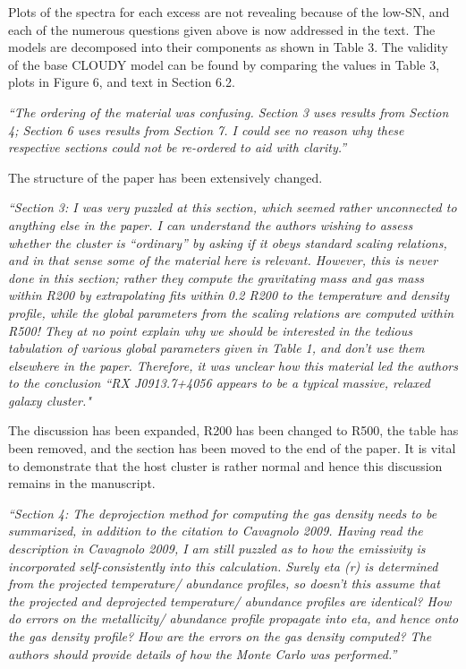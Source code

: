\documentclass[11pt]{article}
\begin{document}
Plots of the spectra for each excess are not revealing because of the
low-SN, and each of the numerous questions given above is now
addressed in the text. The models are decomposed into their components
as shown in Table 3. The validity of the base CLOUDY model can be
found by comparing the values in Table 3, plots in Figure 6, and text
in Section 6.2.

\hrulefill

{\it{``The ordering of the material was confusing. Section 3 uses
    results from Section 4; Section 6 uses results from Section 7. I
    could see no reason why these respective sections could not be
    re-ordered to aid with clarity.''}}

The structure of the paper has been extensively changed.

\hrulefill

{\it{``Section 3: I was very puzzled at this section, which seemed
    rather unconnected to anything else in the paper. I can understand
    the authors wishing to assess whether the cluster is ``ordinary''
    by asking if it obeys standard scaling relations, and in that
    sense some of the material here is relevant. However, this is
    never done in this section; rather they compute the gravitating
    mass and gas mass within R200 by extrapolating fits within 0.2
    R200 to the temperature and density profile, while the global
    parameters from the scaling relations are computed within R500!
    They at no point explain why we should be interested in the
    tedious tabulation of various global parameters given in Table 1,
    and don't use them elsewhere in the paper. Therefore, it was
    unclear how this material led the authors to the conclusion ``RX
    J0913.7+4056 appears to be a typical massive, relaxed galaxy
    cluster."}}

The discussion has been expanded, R200 has been changed to R500, the
table has been removed, and the section has been moved to the end of
the paper. It is vital to demonstrate that the host cluster is rather
normal and hence this discussion remains in the manuscript.

\hrulefill

{\it{``Section 4: The deprojection method for computing the gas
    density needs to be summarized, in addition to the citation to
    Cavagnolo 2009. Having read the description in Cavagnolo 2009, I
    am still puzzled as to how the emissivity is incorporated
    self-consistently into this calculation. Surely eta (r) is
    determined from the projected temperature/ abundance profiles, so
    doesn't this assume that the projected and deprojected
    temperature/ abundance profiles are identical? How do errors on
    the metallicity/ abundance profile propagate into eta, and hence
    onto the gas density profile? How are the errors on the gas
    density computed? The authors should provide details of how the
    Monte Carlo was performed.''}}
\end{document}
